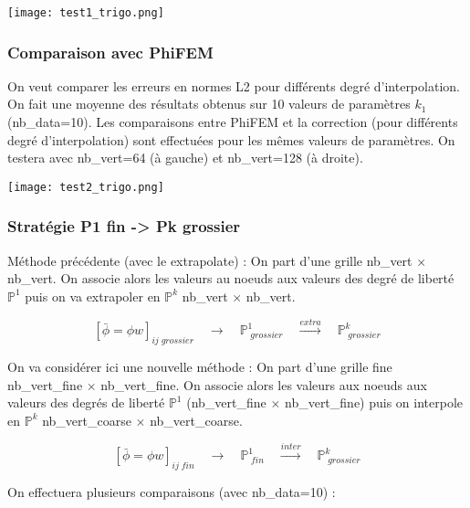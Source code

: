 \begin{minipage}{\linewidth}
	\centering
	\texttt{[image: test1\_trigo.png]}
\end{minipage}

\subsubsection*{Comparaison avec PhiFEM}

On veut comparer les erreurs en normes L2 pour différents degré d'interpolation. On fait une moyenne des résultats obtenus sur  10 valeurs de paramètres $k_1$ (nb\_data=10). Les comparaisons entre PhiFEM et la correction (pour différents degré d'interpolation) sont effectuées pour les mêmes valeurs de paramètres. On testera avec nb\_vert=64 (à gauche) et nb\_vert=128 (à droite). 

\begin{minipage}{\linewidth}
	\centering
	\texttt{[image: test2\_trigo.png]}
\end{minipage}

\subsubsection*{Stratégie P1 fin -> Pk grossier}

Méthode précédente (avec le extrapolate) : On part d'une grille nb\_vert $\times$ nb\_vert. On associe alors les valeurs au noeuds aux valeurs des degré de liberté $\mathbb{P}^1$ puis on va extrapoler en $\mathbb{P}^k$ nb\_vert $\times$ nb\_vert. 

$$[\bar{\phi}=\phi w]_{ij \; grossier} \quad \longrightarrow \quad \mathbb{P}^1_{\; grossier} \quad \overset{extra}{\longrightarrow} \quad \mathbb{P}^k_{\; grossier}$$

On va considérer ici une nouvelle méthode : On part d'une grille fine nb\_vert\_fine $\times$ nb\_vert\_fine. On associe alors les valeurs aux noeuds aux valeurs des degrés de liberté $\mathbb{P}^1$ (nb\_vert\_fine $\times$ nb\_vert\_fine) puis on  interpole en $\mathbb{P}^k$ nb\_vert\_coarse $\times$ nb\_vert\_coarse. 

$$[\bar{\phi}=\phi w]_{ij \; fin} \quad \longrightarrow \quad \mathbb{P}^1_{\; fin} \quad \overset{inter}{\longrightarrow} \quad \mathbb{P}^k_{\; grossier}$$

On effectuera plusieurs comparaisons (avec nb\_data=10) :

